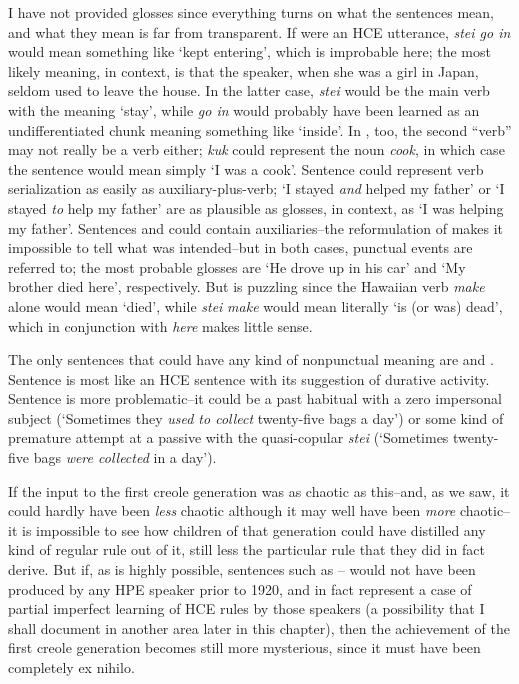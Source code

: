 \noindent I have not provided glosses since everything turns on what the sentences mean, and what they mean is far from transparent. If  were an HCE utterance, \textit{stei go in} would mean something like `kept entering', which is improbable here; the most likely meaning, in context, is that the speaker, when she was a girl in Japan, seldom used to leave the house. In the latter case, \textit{stei} would be the main verb with the meaning `stay', while \textit{go in} would probably have been learned as an undifferentiated chunk meaning something like `inside'. In , too, the second ``verb'' may not really be a verb either; \textit{kuk} could represent the noun \textit{cook}, in which case the sentence would mean simply `I was a cook'. Sentence  could represent verb serialization as easily as auxiliary-plus-verb; `I stayed \textit{and} helped my father' or `I stayed \textit{to} help my father' are as plausible as glosses, in context, as `I was helping my father'. Sentences  and  could contain auxiliaries--the reformu\-lation of  makes it impossible to tell what was intended--but in both cases, punctual events are referred to; the most probable glosses are `He drove up in his car' and `My brother died here', respectively. But  is puzzling since the Hawaiian verb \textit{make} alone would mean `died', while \textit{stei} \textit{make} would mean literally `is (or was) dead', which in conjunction with \textit{here} makes little sense.


The only sentences that could have any kind of nonpunctual meaning are  and . Sentence  is most like an HCE sentence with its suggestion of durative activity. Sentence  is more problematic--it could be a past habitual with a zero impersonal subject (`Some\-times they \textit{used to collect} twenty-five bags a day') or some kind of premature attempt at a passive with the quasi-copular \textit{stei} (`Sometimes twenty-five bags \textit{were collected} in a day').

If the input to the first creole generation was as chaotic as this--and, as we saw, it could hardly have been \textit{less} chaotic although it may well have been \textit{more} chaotic--it is impossible to see how children of that generation could have distilled any kind of regular rule out of it, still less the particular rule that they did in fact derive. But if, as is highly possible, sentences such as -- would not have been produced by any HPE speaker prior to 1920, and in fact represent a case of partial imperfect learning of HCE rules by those speakers (a possibility that I shall document in another area later in this chapter), then the achievement of the first creole generation becomes still more mysterious, since it must have been completely ex nihilo.

